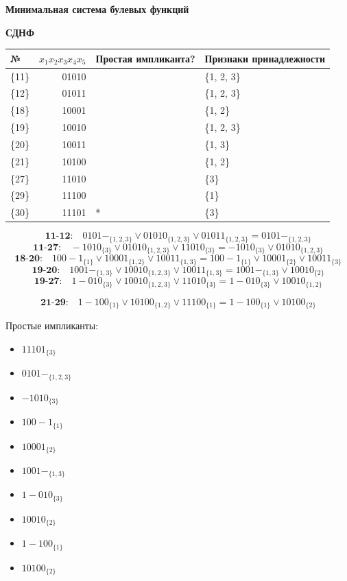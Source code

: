 \textbf{Минимальная система булевых функций}

\textbf{СДНФ}

\begin{longtable}[]{@{}lrll@{}}
\toprule
№ & \(x_1x_2x_3x_4x_5\) & Простая импликанта? & Признаки
принадлежности\tabularnewline
\midrule
\endhead
\{11\} & 01010 & & \{1, 2, 3\}\tabularnewline
\{12\} & 01011 & & \{1, 2, 3\}\tabularnewline
\{18\} & 10001 & & \{1, 2\}\tabularnewline
\{19\} & 10010 & & \{1, 2, 3\}\tabularnewline
\{20\} & 10011 & & \{1, 3\}\tabularnewline
\{21\} & 10100 & & \{1, 2\}\tabularnewline
\{27\} & 11010 & & \{3\}\tabularnewline
\{29\} & 11100 & & \{1\}\tabularnewline
\{30\} & 11101 & * & \{3\}\tabularnewline
\bottomrule
\end{longtable}

\[\textbf{11-12:}\quad  0101-_{\{1,2,3\}} \lor 01010_{\{1,2,3\}} \lor 01011_{\{1,2,3\}} = 0101-_{\{1,2,3\}}\]
\[\textbf{11-27:}\quad  -1010_{\{3\}} \lor 01010_{\{1,2,3\}} \lor 11010_{\{3\}} = -1010_{\{3\}} \lor 01010_{\{1,2,3\}}\]
\[\textbf{18-20:}\quad  100-1_{\{1\}} \lor 10001_{\{1,2\}} \lor 10011_{\{1,3\}} = 100-1_{\{1\}} \lor 10001_{\{2\}} \lor 10011_{\{3\}}\]
\[\textbf{19-20:}\quad  1001-_{\{1,3\}} \lor 10010_{\{1, 2, 3\}} \lor 10011_{\{1,3\}} = 1001-_{\{1,3\}} \lor 10010_{\{2\}}\]
\[\textbf{19-27:}\quad 1-010_{\{3\}} \lor 10010_{\{1, 2, 3\}} \lor 11010_{\{3\}} = 1-010_{\{3\}} \lor 10010_{\{1,2\}}\]

\[\textbf{21-29:}\quad  1-100_{\{1\}} \lor 10100_{\{1, 2\}} \lor 11100_{\{1\}} = 1-100_{\{1\}} \lor 10100_{\{2\}}\]

Простые импликанты:

\begin{itemize}
\tightlist
\item
  \(11101_{\{3\}}\)
\item
  \(0101-_{\{1,2,3\}}\)
\item
  \(-1010_{\{3\}}\)
\item
  \(100-1_{\{1\}}\)
\item
  \(10001_{\{2\}}\)
\item
  \(1001-_{\{1,3\}}\)
\item
  \(1-010_{\{3\}}\)
\item
  \(10010_{\{2\}}\)
\item
  \(1-100_{\{1\}}\)
\item
  \(10100_{\{2\}}\)
\end{itemize}


